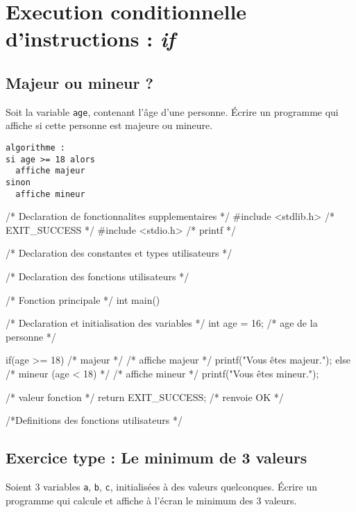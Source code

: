 \section{Execution conditionnelle d'instructions :  \emph{if}}

\subsection{Majeur ou mineur ?}

Soit la variable \verb|age|, contenant l'âge d'une personne. Écrire un programme qui affiche si cette personne est majeure ou mineure.

\begin{correction}
\begin{verbatim}
algorithme :
si age >= 18 alors 
  affiche majeur
sinon 
  affiche mineur
\end{verbatim}
\begin{listing}{1}
/* Declaration de fonctionnalites supplementaires */
#include <stdlib.h> /* EXIT_SUCCESS */
#include <stdio.h> /* printf */

/* Declaration des constantes et types utilisateurs */

/* Declaration des fonctions utilisateurs */

/* Fonction principale */
int main()
{
    /* Declaration et initialisation des variables */
    int age = 16; /* age de la personne */

    if(age >= 18) /* majeur */
    {
	/* affiche majeur */
	printf("Vous êtes majeur.\n");
    }
    else /* mineur (age < 18) */
    {
	/* affiche mineur */
	printf("Vous êtes mineur.\n");
    }
    
    /* valeur fonction */
    return EXIT_SUCCESS; /* renvoie OK */
}

/*Definitions des fonctions utilisateurs */
\end{listing}
\end{correction}

\subsection{Exercice type :  Le minimum de 3 valeurs}

Soient 3 variables \verb|a|, \verb|b|, \verb|c|, initialisées à des
valeurs quelconques. Écrire un programme qui calcule et affiche à
l'écran le minimum des 3 valeurs.

